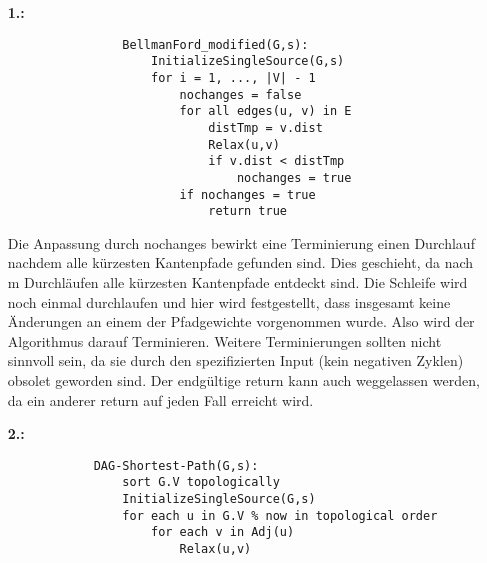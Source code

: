 \documentclass[a4paper,11pt,fleqn]{scrartcl}
\title{\titleinfo}
\author{\authorinfo}
\begin{document}
	\maketitle
	\begin{enumerate}
		\item[\textbf{1.:}] \quad \\
			\begin{verbatim}
				BellmanFord_modified(G,s):
				    InitializeSingleSource(G,s)
				    for i = 1, ..., |V| - 1
				        nochanges = false
				        for all edges(u, v) in E
				            distTmp = v.dist
				            Relax(u,v)
				            if v.dist < distTmp
				                nochanges = true
				        if nochanges = true
				            return true
			\end{verbatim}
		
			Die Anpassung durch nochanges bewirkt eine Terminierung einen Durchlauf nachdem alle kürzesten
			Kantenpfade gefunden sind. Dies geschieht, da nach m Durchläufen alle kürzesten Kantenpfade entdeckt
			sind. Die Schleife wird noch einmal durchlaufen und hier wird festgestellt, dass insgesamt keine
			Änderungen an einem der Pfadgewichte vorgenommen wurde. Also wird der Algorithmus darauf Terminieren.
			Weitere Terminierungen sollten nicht sinnvoll sein, da sie durch den spezifizierten Input (kein
			negativen Zyklen) obsolet geworden sind. Der endgültige return kann auch weggelassen werden, da ein 	
			anderer return auf jeden Fall erreicht wird.
		\item[\textbf{2.:}] \quad \\
			\begin{verbatim}
			DAG-Shortest-Path(G,s):
			    sort G.V topologically
			    InitializeSingleSource(G,s)
			    for each u in G.V % now in topological order
			        for each v in Adj(u)
			            Relax(u,v)
			\end{verbatim}				
			

\end{enumerate}
\end{document}
